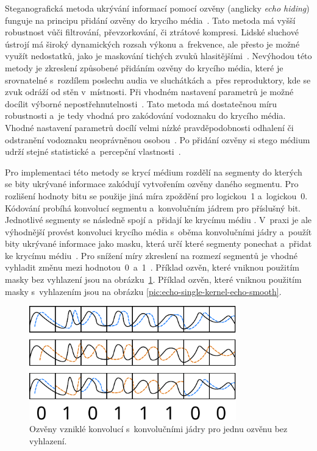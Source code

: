 Steganografická metoda ukrývání informací pomocí ozvěny (anglicky \textit{echo
hiding}) funguje na principu přidání ozvěny do krycího
média~\cite{Djebbar2012}. Tato metoda má vyšší robustnost vůči filtrování,
převzorkování, či ztrátové kompresi. Lidské sluchové ústrojí má široký
dynamických rozsah výkonu a~frekvence, ale přesto je možné využít nedostatků,
jako je maskování tichých zvuků hlasitějšími~\cite{Gruhl1996}. Nevýhodou této
metody je zkreslení způsobené přidáním ozvěny do krycího média, které je
srovnatelné s~rozdílem poslechu audia ve sluchátkách a~přes reproduktory, kde
se zvuk odráží od stěn v~místnosti. Při vhodném nastavení parametrů je možné
docílit výborné nepostřehnutelnosti~\cite{Gruhl1996}. Tato metoda má
dostatečnou míru robustnosti a~je tedy vhodná pro zakódování vodoznaku do
krycího média. Vhodné nastavení parametrů docílí velmi nízké pravděpodobnosti
odhalení či odstranění vodoznaku neoprávněnou osobou~\cite{Gruhl1996}. Po
přidání ozvěny si stego médium udrží stejné statistické a~percepční
vlastnosti~\cite{Djebbar2012}.

Pro implementaci této metody se krycí médium rozdělí na segmenty do kterých se
bity ukrývané informace zakódují vytvořením ozvěny daného segmentu. Pro
rozlišení hodnoty bitu se použije jiná míra zpoždění pro logickou~1
a~logickou~0. Kódování probíhá konvolucí segmentu a~konvolučním jádrem pro
příslušný bit. Jednotlivé segmenty se následně spojí a~přidají ke krycímu médiu
\cite{Gruhl1996}. V~praxi je ale výhodnější provést konvoluci krycího média
s~oběma konvolučními jádry a~použít bity ukrývané informace jako masku, která
určí které segmenty ponechat a~přidat ke krycímu médiu~\cite{Gruhl1996}. Pro
snížení míry zkreslení na rozmezí segmentů je vhodné vyhladit změnu mezi
hodnotou~0~a~1~\cite{Tekeli2017}. Příklad ozvěn, které vniknou použitím masky
bez vyhlazení jsou na obrázku~\ref{pic:echo-single-kernel-echo}. Příklad ozvěn,
které vniknou použitím masky s~vyhlazením jsou na obrázku
\ref{pic:echo-single-kernel-echo-smooth}.

\begin{figure}[hbt]
    \centering
    \includegraphics[width=0.8\textwidth]{obrazky/echo-diagram.pdf}
    \caption{Ozvěny vzniklé konvolucí s~konvolučními jádry pro jednu ozvěnu bez
    vyhlazení.}
    \label{pic:echo-single-kernel-echo}
\end{figure}

